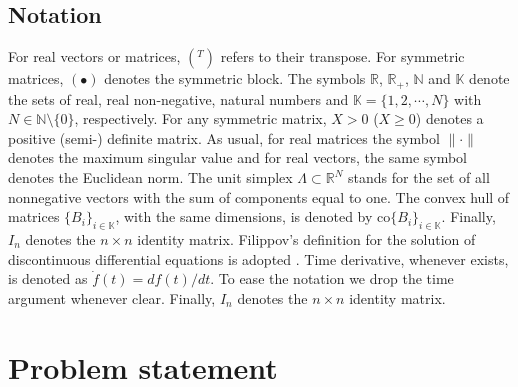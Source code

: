 \documentclass[twocolumn]{autarc_LH}
\newcommand{\Rf}{{\mathbb R}}
\newcommand{\Kn}{{\mathbb K}}
\begin{document}
\subsection{Notation}

For real vectors or matrices, $(^T)$ refers to their transpose. For symmetric matrices, $(\bullet)$ denotes the symmetric block. The symbols $\mathbb{R}$,  $\mathbb{R}_+$, $\mathbb{N}$ and $\Kn$ denote the sets of real, real non-negative, natural numbers and $\Kn=\{1, 2, \cdots, N\}$ with $N \in \mathbb{N} \setminus \{0\}$, respectively. For any symmetric matrix, $X>0$ ($X \geq 0$) denotes a positive (semi-) definite matrix. As usual, for real matrices the symbol $\| \cdot \|$ denotes the maximum singular value and for real vectors, the same symbol denotes the Euclidean norm. The unit simplex $\Lambda \subset \Rf^N$ stands for the set of all nonnegative vectors with the sum of components equal to one. The convex hull of matrices $\{B_i\}_{i \in \Kn}$, with the same dimensions, is denoted by $\text{co} \{B_i\}_{i \in \Kn}$. Finally, $I_n$ denotes the $n \! \times \! n$ identity matrix. Filippov’s definition for the solution of discontinuous differential equations is adopted \cite{F:88}. Time derivative, whenever exists, is denoted as $\dot f(t) = df(t)/dt$. To ease the notation we drop the time argument whenever clear. Finally, $I_n$ denotes the $n \times n$ identity matrix. 

\section{Problem statement}
\end{document}
